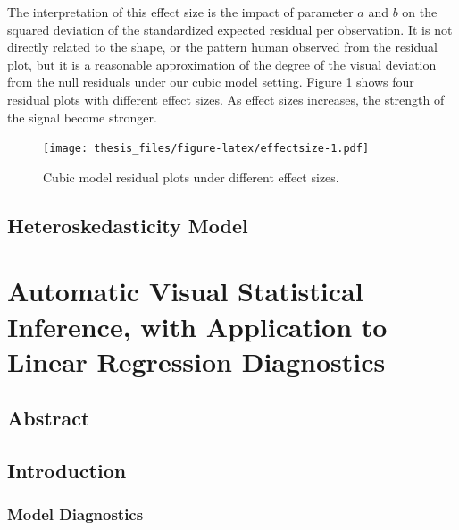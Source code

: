 \documentclass{monashthesis}
\begin{document}
The interpretation of this effect size is the impact of parameter \(a\) and \(b\) on the squared deviation of the standardized expected residual per observation. It is not directly related to the shape, or the pattern human observed from the residual plot, but it is a reasonable approximation of the degree of the visual deviation from the null residuals under our cubic model setting. Figure \ref{fig:effectsize} shows four residual plots with different effect sizes. As effect sizes increases, the strength of the signal become stronger.

\begin{figure}
\centering
\texttt{[image: thesis\_files/figure-latex/effectsize-1.pdf]}
\caption{\label{fig:effectsize}Cubic model residual plots under different effect sizes.}
\end{figure}

\hypertarget{section}{%
\subsection{}\label{section}}

\hypertarget{heteroskedasticity-model}{%
\section{Heteroskedasticity Model}\label{heteroskedasticity-model}}

\clearpage

\hypertarget{ch:paper1}{%
\chapter{Automatic Visual Statistical Inference, with Application to Linear Regression Diagnostics}\label{ch:paper1}}

\hypertarget{abstract-1}{%
\section{Abstract}\label{abstract-1}}

\hypertarget{introduction}{%
\section{Introduction}\label{introduction}}

\hypertarget{model-diagnostics}{%
\subsection{Model Diagnostics}\label{model-diagnostics}}
\end{document}
